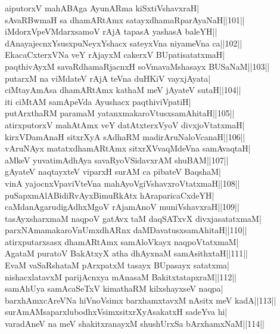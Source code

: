 \documentclass{article}
\begin{document}
aiputorxV mahABAga AyunARma kiSxtiVshavxraH|\\
sAvaRBwmaH sa dhamARtAmx satayxdhamaRparAyaNaH||101||\\
iMdorxVpeVMdarxsamoV rAjA tapasA yashasA baleYH||\\
dAnayajecnxYsusxpuNeyxYshacx sateyxVna niyameVna ca||102||\\
EkacaCxterxVNa veY rAjayxM cakerxV BUpatisatatxmaH|\\
paqthivAyxM savaRdhamaRjacnxH soVmavaMshasayx BUSaNaM||103||\\
putarxM na viMdateV rAjA teVna duHKiV vayxjAyata|\\
ciMtayAmAsa dhamARtAmx kathaM meV jAyateV sutaH||104||\\
iti ciMtAM samApeVda Ayushacx paqthiviVpatiH|\\
putArxthaRM paramaM yatanxmakaroVtusxsamAhitaH||105||\\
atirxputorxV mahAtAmx veY datAtxterxVyoV divxjoVtatxmaH|\\
kirxVDamAnaH sitxrXyA sAdhaRM madirAruNaloVcanaH||106||\\
vAruNAyx matatxdhamARtAmx sitxrXVvaqMdeVna samAvaqtaH|\\
aMkeV yuvatimAdhAya savaRyoVSidavxrAM shuBAM||107||\\
gAyateV naqtayxteV viparxH surAM ca pibateV BaqshaM|\\
vinA yajocnxVpaviVteVna mahAyoVgiVshavxroVtatxmaH||108||\\
puSapxmAlABidiRvAyxBimuRkAtx hAraparicaCxdeYH|\\
caMdanAgarudigAdhxMgoV rAjamAnoV muniVshavxraH||109||\\
tasAyxsharxmaM naqpoV gatAvx taM daqSATxvX divxjasatatxmaM|\\
parxNAmamakaroVnUmxdhARnx daMDavatusxsamAhitaH||110||\\
atirxputarxsasx dhamARtAmx samAloVkayx naqpoVtatxmaM|\\
AgataM puratoV BakAtxyX atha dhAyxnaM samAsithxtaH||111||\\
EvaM vaSaRshataM pArxpatxM tasayx BUpasayx satatxma|\\
nishacxlatavxM parijAcnxya mAnasaM BakitxtatapxraM||112||\\
samAhUya samAcaSeTxV kimathaRM kilxshayxseV naqpa|\\
barxhAmxcAreVNa hiVnoVsimx barxhamxtavxM nAsitx meV kadA||113||\\
surAmAMsaparxlubodhxVsimxsitxrXyAsakatxH sadeYva hi|\\
varadAneV na meV shakitxranayxM shushUrxSa bArxhamxNaM||114||\\
\end{document}
